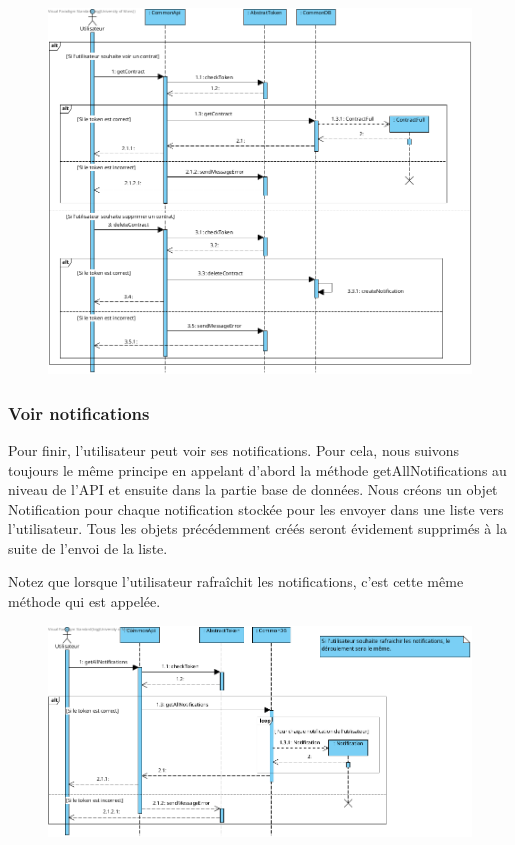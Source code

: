 \begin{figure}[h]
\centering
\includegraphics[width = 1\textwidth]{Base/sequence/img/common/Voir les contrats.png}
\end{figure}

\newpage

\subsubsection{Voir notifications}

\begin{flushleft}
Pour finir, l'utilisateur peut voir ses notifications. Pour cela, nous suivons toujours le même principe en appelant d'abord la méthode getAllNotifications au niveau de l'API et ensuite dans la partie base de données. Nous créons un objet Notification pour chaque notification stockée pour les envoyer dans une liste vers l'utilisateur. Tous les objets précédemment créés seront évidement supprimés à la suite de l'envoi de la liste.
\end{flushleft}

\begin{flushleft}
Notez que lorsque l'utilisateur rafraîchit les notifications, c'est cette même méthode qui est appelée.
\end{flushleft}

\begin{figure}[h]
\centering
\includegraphics[width = 1\textwidth]{Base/sequence/img/common/Voir notifications.png}
\end{figure}

